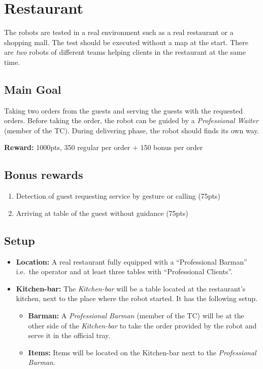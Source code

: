 \section{Restaurant}
The robots are tested in a real environment such as a real restaurant or a shopping mall. The test should be executed without a map at the start.
There are \emph{two} robots of different teams helping clients in the restaurant at the same time.


\subsection{Main Goal}
Taking two orders from the guests and serving the guests with the requested orders. Before taking the order, the robot can be guided by a \textit{Professional Waiter} (member of the TC). During delivering phase, the robot should finds its own way.

\noindent\textbf{Reward:} 1000pts, 350 regular per order + 150 bonus per order

\subsection{Bonus rewards}
\begin{enumerate}[nosep]
	\item Detection of guest requesting service by gesture or calling (75pts)
	\item Arriving at table of the guest without guidance (75pts)
\end{enumerate}

\subsection{Setup}
\begin{itemize}[nosep]
	\item \textbf{Location:} A real restaurant fully equipped with a \enquote{Professional Barman} i.e.~the operator and at least three tables with \enquote{Professional Clients}.
    \item \textbf{Kitchen-bar:} The \textit{Kitchen-bar} will be a table located at the restaurant's kitchen, next to the place where the robot started. It has the following setup.
	\begin{itemize}[nosep]
		\item \textbf{Barman:} A \textit{Professional Barman} (member of the TC) will be at the other side of the \textit{Kitchen-bar} to take the order provided by the robot and serve it in the official tray.
		\item \textbf{Items:} Items will be located on the Kitchen-bar next to the \textit{Professional Barman}.
	\end{itemize}
\end{itemize}


